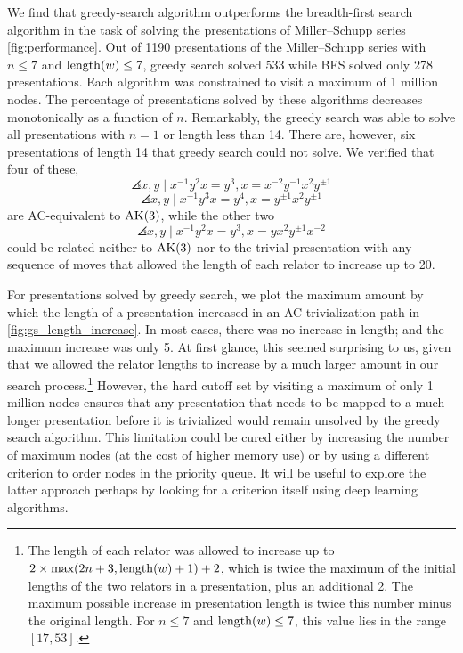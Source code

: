 We find that greedy-search algorithm outperforms the breadth-first search algorithm in the task of solving the presentations of Miller--Schupp series \autoref{fig:performance}.
Out of 1190 presentations of the Miller--Schupp series with $n \leq 7$ and $\operatorname{length}(w) \leq 7$, greedy search solved 533 while BFS solved only 278 presentations.
Each algorithm was constrained to visit a maximum of 1 million nodes.
The percentage of presentations solved by these algorithms decreases monotonically as a function of $n$.
Remarkably, the greedy search was able to solve all presentations with $n=1$ or length less than 14.
There are, however, six presentations of length 14 that greedy search could not solve.
We verified that four of these,
\[
\angles{x, y \mid x^{-1} y^2 x = y^{3} , x = x^{-2} y^{-1} x^2 y^{\pm 1}}
\]
\[
\angles{x, y \mid x^{-1} y^3 x = y^{4} , x = y^{\pm 1} x^2 y^{\pm 1}}
\]
are AC-equivalent to $\text{AK}(3)$, while the other two
\[
\angles{x, y \mid x^{-1} y^2 x = y^{3} , x = y x^2 y^{\pm 1} x^{-2}}
\]
could be related neither to $\text{AK}(3)$ nor to the trivial presentation with any sequence of moves that allowed the length of each relator to increase up to 20.

For presentations solved by greedy search, we plot the maximum amount by which the length of a presentation increased in an AC trivialization path in \autoref{fig:gs_length_increase}.
In most cases, there was no increase in length; and the maximum increase was only 5.
At first glance, this seemed surprising to us, given that we allowed the relator lengths to increase by a much larger amount in our search process.\footnote{The length of each relator was allowed to increase up to \(2 \times \text{max}(2n+3, \operatorname{length}(w)+1) + 2\), which is twice the maximum of the initial lengths of the two relators in a presentation, plus an additional 2.
The maximum possible increase in presentation length is twice this number minus the original length.
For $n \leq 7$ and $\operatorname{length}(w) \leq 7$, this value lies in the range $[17, 53]$.}
However, the hard cutoff set by visiting a maximum of only 1 million nodes ensures that any presentation that needs to be mapped to a much longer presentation before it is trivialized would remain unsolved by the greedy search algorithm.
This limitation could be cured either by increasing the number of maximum nodes (at the cost of higher memory use) or by using a different criterion to order nodes in the priority queue.
It will be useful to explore the latter approach perhaps by looking for a criterion itself using deep learning algorithms.

